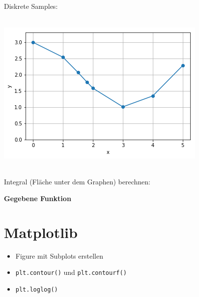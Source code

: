\begin{minipage}[t]{0.49\textwidth}
	Diskrete Samples:
	
\end{minipage}
\hspace{0.02\textwidth}
\begin{minipage}[t]{0.49\textwidth}
	$\quad$\\[1pt]
	\includegraphics[width=\textwidth]{images/v9_integrate1}
\end{minipage}

\begin{minipage}[t]{0.49\textwidth}
	$\quad$\\[15pt]
	Integral (Fläche unter dem Graphen) berechnen:
\end{minipage}
\hspace{0.02\textwidth}
\begin{minipage}[t]{0.49\textwidth}
	
\end{minipage}


\pagebreak

\textbf{Gegebene Funktion}


\section{Matplotlib}
\begin{itemize}
	\item Figure mit Subplots erstellen
	\item \texttt{plt.contour()} und \texttt{plt.contourf()}
	\item \texttt{plt.loglog()}
\end{itemize}

